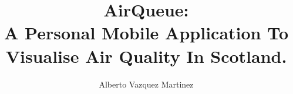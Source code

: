 \documentclass[bsc,logo, abbrevs]{infthesis}
\title{AirQueue: \protect\\ A Personal Mobile Application To Visualise Air Quality In Scotland.}
\author{Alberto Vazquez Martinez}
\begin{document}
\begin{preliminary}

\maketitle

\standarddeclaration
\dedication{Acknowledgements}
\tableofcontents
\listoffigures
\iffalse
\listoftables
\begin{accron}\end{accron}
\fi
\end{preliminary}














\appendix

\end{document}
